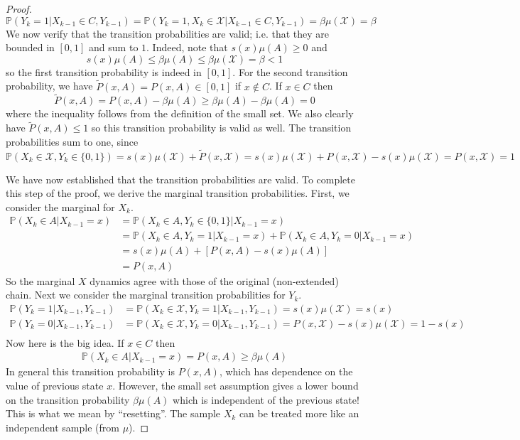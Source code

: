 \documentclass[12pt]{article}
\newcommand{\Prob}{\mathbb{P}}
\begin{document}
\begin{proof}
\[\Prob(Y_k = 1|X_{k-1} \in C, Y_{k-1}) = \Prob(Y_k = 1, X_k \in \mathcal{X}|X_{k-1} \in C, Y_{k-1}) = \beta \mu(\mathcal{X}) = \beta\]
We now verify that the transition probabilities are valid; i.e. that they are bounded in $[0, 1]$ and sum to $1$. Indeed, note that $s(x) \mu(A) \geq 0$ and 
\[s(x) \mu(A) \leq \beta \mu(A) \leq \beta \mu(\mathcal{X}) = \beta < 1\]
so the first transition probability is indeed in $[0, 1]$. For the second transition probability, we have $\tilde{P}(x, A) = P(x, A) \in [0, 1]$ if $x \notin C$. If $x \in C$ then 
\[\tilde{P}(x, A) = P(x, A) - \beta \mu(A) \geq \beta \mu(A) - \beta \mu(A) = 0\]
where the inequality follows from the definition of the small set. We also clearly have $\tilde{P}(x, A) \leq 1$ so this transition probability is valid as well. The transition probabilities sum to one, 
since 
\[\Prob(X_k \in \mathcal{X}, Y_k \in \{0, 1\}) = s(x)\mu(\mathcal{X}) + \tilde{P}(x, \mathcal{X}) = s(x)\mu(\mathcal{X}) + P(x, \mathcal{X}) - s(x)\mu(\mathcal{X}) =  P(x, \mathcal{X}) = 1\]

We have now established that the transition probabilities are valid. To complete this step of the proof, we derive the marginal transition probabilities. First, we consider the marginal for 
$X_k$. 
\begin{align*}
\Prob(X_k \in A|X_{k - 1} = x) &= \Prob(X_k \in A, Y_k \in \{0, 1\}| X_{k - 1} = x) \\
					     &= \Prob(X_k \in A, Y_k = 1| X_{k - 1} = x) + \Prob(X_k \in A, Y_k = 0| X_{k - 1} = x) \\
					     &= s(x)\mu(A) + \left[P(x, A) - s(x)\mu(A) \right] \\
					     &= P(x, A)
\end{align*}
So the marginal $X$ dynamics agree with those of the original (non-extended) chain. Next we consider the marginal transition probabilities for $Y_k$.
\begin{align*}
\Prob(Y_k = 1|X_{k-1}, Y_{k-1}) &= \Prob(X_k \in \mathcal{X}, Y_k = 1|X_{k-1}, Y_{k-1}) = s(x)\mu(\mathcal{X}) = s(x) \\
\Prob(Y_k = 0|X_{k-1}, Y_{k-1}) &= \Prob(X_k \in \mathcal{X}, Y_k = 0|X_{k-1}, Y_{k-1}) = P(x, \mathcal{X}) - s(x)\mu(\mathcal{X}) = 1- s(x) \\
\end{align*}
Now here is the big idea. If $x \in C$ then 
\begin{align*}
\Prob(X_k \in A|X_{k-1} = x) = P(x, A) \geq \beta \mu(A)
\end{align*}
In general this transition probability is $P(x, A)$, which has dependence on the value of previous state $x$. However, the small set assumption gives a lower bound on the transition 
probability $\beta \mu(A)$ which is independent of the previous state! This is what we mean by ``resetting''. The sample $X_k$ can be treated more like an independent sample (from $\mu$). 


\end{proof}
\end{document}
